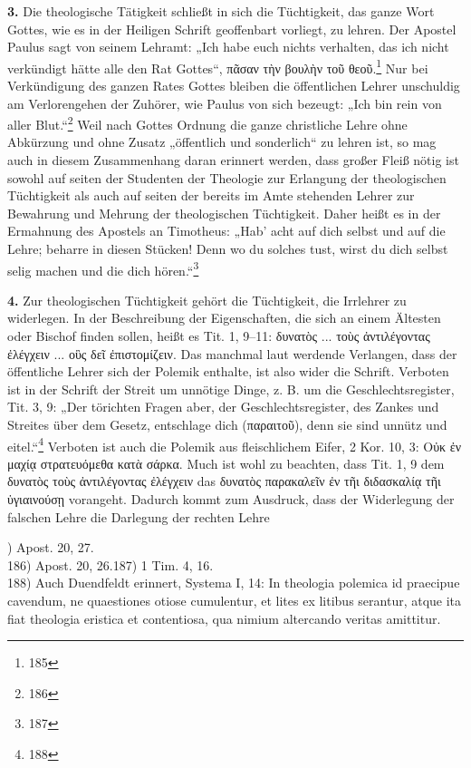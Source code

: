 \textbf{3.} Die theologische Tätigkeit schließt in sich die Tüchtigkeit, das ganze Wort Gottes, wie es in der Heiligen Schrift geoffenbart vorliegt, zu lehren. Der Apostel Paulus sagt von seinem Lehramt: „Ich habe euch nichts verhalten, das ich nicht verkündigt hätte alle den Rat Gottes“, \foreignlanguage{greek}{πᾶσαν τὴν βουλὴν τοῦ θεοῦ.}\footnote{185} Nur bei Verkündigung des ganzen Rates Gottes bleiben die öffentlichen Lehrer unschuldig am Verlorengehen der Zuhörer, wie Paulus von sich bezeugt: „Ich bin rein von aller Blut.“\footnote{186} Weil nach Gottes Ordnung die ganze christliche Lehre ohne Abkürzung und ohne Zusatz „öffentlich und sonderlich“ zu lehren ist, so mag auch in diesem Zusammenhang daran erinnert werden, dass großer Fleiß nötig ist sowohl auf seiten der Studenten der Theologie zur Erlangung der theologischen Tüchtigkeit als auch auf seiten der bereits im Amte stehenden Lehrer zur Bewahrung und Mehrung der theologischen Tüchtigkeit. Daher heißt es in der Ermahnung des Apostels an Timotheus: „Hab' acht auf dich selbst und auf die Lehre; beharre in diesen Stücken! Denn wo du solches tust, wirst du dich selbst selig machen und die dich hören.“\footnote{187}

\textbf{4.} Zur theologischen Tüchtigkeit gehört die Tüchtigkeit, die Irrlehrer zu widerlegen. In der Beschreibung der Eigenschaften, die sich an einem Ältesten oder Bischof finden sollen, heißt es Tit. 1, 9--11: \foreignlanguage{greek}{δυνατὸς ... τοὺς ἀντιλέγοντας ἐλέγχειν ... οὓς δεῖ ἐπιστομίζειν}. Das manchmal laut werdende Verlangen, dass der öffentliche Lehrer sich der Polemik enthalte, ist also wider die Schrift. Verboten ist in der Schrift der Streit um unnötige Dinge, z. B. um die Geschlechtsregister, Tit. 3, 9: „Der törichten Fragen aber, der Geschlechtsregister, des Zankes und Streites über dem Gesetz, entschlage dich (\foreignlanguage{greek}{παραιτοῦ}), denn sie sind unnütz und eitel.“\footnote{188} Verboten ist auch die Polemik aus fleischlichem Eifer, 2 Kor. 10, 3: \foreignlanguage{greek}{Οὐκ ἐν μαχίᾳ στρατευόμεθα κατὰ σάρκα.} Much ist wohl zu beachten, dass Tit. 1, 9 dem \foreignlanguage{greek}{δυνατὸς τοὺς ἀντιλέγοντας ἐλέγχειν} das \foreignlanguage{greek}{δυνατὸς παρακαλεῖν ἐν τῆι διδασκαλίᾳ τῆι ὑγιαινούσῃ} vorangeht. Dadurch kommt zum Ausdruck, dass der Widerlegung der falschen Lehre die Darlegung der rechten Lehre

\vspace{1em}
\footnotesize
{}) Apost. 20, 27.\\
186) Apost. 20, 26.\hfill 187) 1 Tim. 4, 16.\\
188) Auch Duendfeldt erinnert, Systema I, 14: In theologia polemica id praecipue cavendum, ne quaestiones otiose cumulentur, et lites ex litibus serantur, atque ita fiat theologia eristica et contentiosa, qua nimium altercando veritas amittitur.
